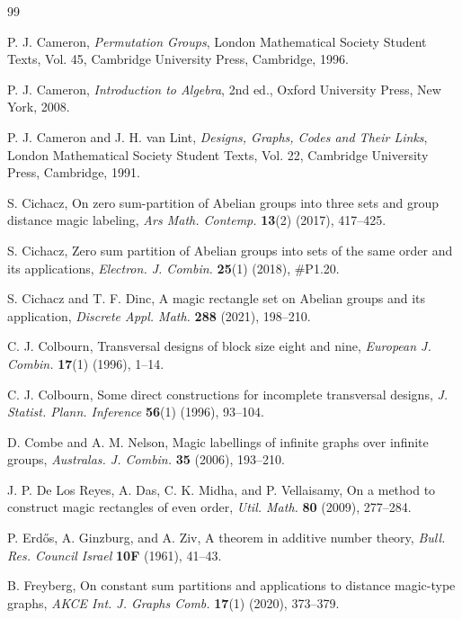\documentclass[preprint,11pt]{elsarticle}
\begin{document}
\begin{thebibliography}{99}

P. J. Cameron,
\emph{Permutation Groups},
London Mathematical Society Student Texts, Vol. 45,
Cambridge University Press, Cambridge, 1996.


P. J. Cameron,
\emph{Introduction to Algebra},
2nd ed.,
Oxford University Press, New York, 2008.

P. J. Cameron and J. H. van Lint,
\emph{Designs, Graphs, Codes and Their Links},
London Mathematical Society Student Texts, Vol. 22,
Cambridge University Press, Cambridge, 1991.


S. Cichacz,
On zero sum-partition of Abelian groups into three sets and group distance magic labeling,
\emph{Ars Math. Contemp.} \textbf{13}(2) (2017), 417--425.


S. Cichacz,
Zero sum partition of Abelian groups into sets of the same order and its applications,
\emph{Electron. J. Combin.} \textbf{25}(1) (2018), \#P1.20.


S. Cichacz and T. F. Dinc,
A magic rectangle set on Abelian groups and its application,
\emph{Discrete Appl. Math.} \textbf{288} (2021), 198--210.


C. J. Colbourn,
Transversal designs of block size eight and nine,
\emph{European J. Combin.} \textbf{17}(1) (1996), 1--14.


C. J. Colbourn,
Some direct constructions for incomplete transversal designs,
\emph{J. Statist. Plann. Inference} \textbf{56}(1) (1996), 93--104.


D. Combe and A. M. Nelson,
Magic labellings of infinite graphs over infinite groups,
\emph{Australas. J. Combin.} \textbf{35} (2006), 193--210.

J. P. De Los Reyes, A. Das, C. K. Midha, and P. Vellaisamy,
On a method to construct magic rectangles of even order,
\emph{Util. Math.} \textbf{80} (2009), 277--284.


P. Erd\H{o}s, A. Ginzburg, and A. Ziv,
A theorem in additive number theory,
\emph{Bull. Res. Council Israel} \textbf{10F} (1961), 41--43.

B. Freyberg,
On constant sum partitions and applications to distance magic-type graphs,
\emph{AKCE Int. J. Graphs Comb.} \textbf{17}(1) (2020), 373--379.



\end{thebibliography}
\end{document}
